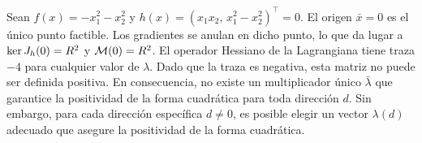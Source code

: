 \begin{counterexample}\label{v1:exa:2.3.4}
	Sean $f(x) = -x_1^2 - x_2^2$ y $h(x) = (x_1 x_2, \, x_1^2 - x_2^2)^\top = 0$. El origen $\bar{x} = 0$ es el único punto factible. Los gradientes se anulan en dicho punto, lo que da lugar a $\ker J_h(0) = R^2$ y $\mathcal{M}(0) = R^2$. El operador Hessiano de la Lagrangiana tiene traza $-4$ para cualquier valor de $\lambda$. Dado que la traza es negativa, esta matriz no puede ser definida positiva. En consecuencia, no existe un multiplicador único $\bar{\lambda}$ que garantice la positividad de la forma cuadrática para toda dirección $d$. Sin embargo, para cada dirección específica $d \neq 0$, es posible elegir un vector $\lambda(d)$ adecuado que asegure la positividad de la forma cuadrática.
\end{counterexample}
